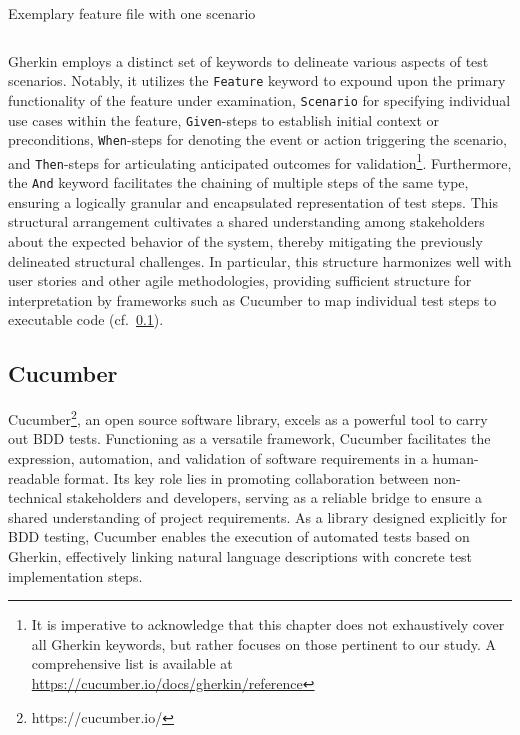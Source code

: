 \begin{listing}[!ht]
\caption{Exemplary feature file with one scenario}
\label{lst:withdrawcash}
\inputminted{gherkin}{files/code/atm.feature}
\end{listing}

 Gherkin employs a distinct set of keywords to delineate various aspects of test scenarios. Notably, it utilizes the \texttt{Feature} keyword to expound upon the primary functionality of the feature under examination, \texttt{Scenario} for specifying individual use cases within the feature, \texttt{Given}-steps to establish initial context or preconditions, \texttt{When}-steps for denoting the event or action triggering the scenario, and \texttt{Then}-steps for articulating anticipated outcomes for validation\footnote{It is imperative to acknowledge that this chapter does not exhaustively cover all Gherkin keywords, but rather focuses on those pertinent to our study. A comprehensive list is available at \href{https://cucumber.io/docs/gherkin/reference/\#keywords}{https://cucumber.io/docs/gherkin/reference}}. Furthermore, the \texttt{And} keyword facilitates the chaining of multiple steps of the same type, ensuring a logically granular and encapsulated representation of test steps. This structural arrangement cultivates a shared understanding among stakeholders about the expected behavior of the system, thereby mitigating the previously delineated structural challenges. In particular, this structure harmonizes well with user stories and other agile methodologies, providing sufficient structure for interpretation by frameworks such as Cucumber to map individual test steps to executable code (cf.~\cref{subsec:cucumber}).~\cite{noauthor_gherkin_nodate}


\subsection{Cucumber}
\label{subsec:cucumber}
Cucumber\footnote{https://cucumber.io/}, an open source software library, excels as a powerful tool to carry out \ac{BDD} tests. Functioning as a versatile framework, Cucumber facilitates the expression, automation, and validation of software requirements in a human-readable format. Its key role lies in promoting collaboration between non-technical stakeholders and developers, serving as a reliable bridge to ensure a shared understanding of project requirements. As a library designed explicitly for BDD testing, Cucumber enables the execution of automated tests based on Gherkin, effectively linking natural language descriptions with concrete test implementation steps.

